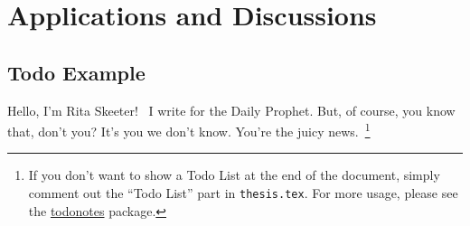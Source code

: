 \chapter{Applications and Discussions}
\label{c:appli&disc}

\section{Todo Example}
\label{s:todo}

Hello, I'm Rita Skeeter!~
I write for the Daily Prophet. 
But, of course, you know that, don't you? 
It's you we don't know. 
You're the juicy news.~\footnote{
  If you don't want to show a Todo List at the end of the document, 
  simply comment out the ``Todo List'' part in \texttt{thesis.tex}. 
  For more usage, please see the 
  \href{http://tug.ctan.org/macros/latex/contrib/todonotes/todonotes.pdf}{\textsf{todonotes}} 
  package.
}

\vspace{1em}

